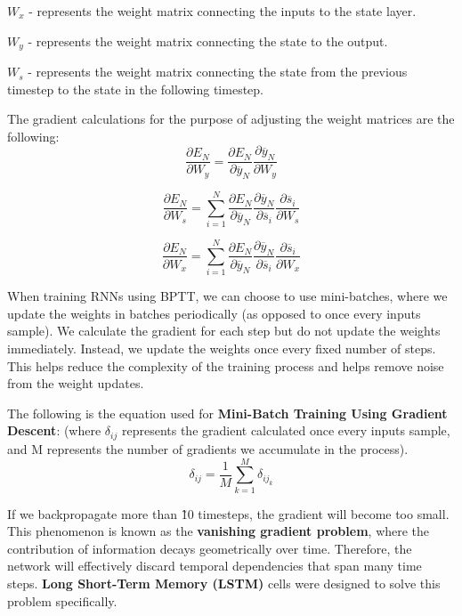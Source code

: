 \(W_x\) - represents the weight matrix connecting the inputs to the state layer.\newline

\(W_y\) - represents the weight matrix connecting the state to the output. \newline

\(W_s\) - represents the weight matrix connecting the state from the previous timestep to the state in the following timestep. \newline

The gradient calculations for the purpose of adjusting the weight matrices are the following: \[\frac{\partial E_N}{\partial W_y} = \frac{\partial E_N}{\partial \overline{y}_N} \frac{\partial \overline{y}_N}{\partial W_y}\] 

\[\frac{\partial E_N}{\partial W_s} = \sum_{i=1}^N \frac{\partial E_N}{\partial \overline{y}_N} \frac{\partial \overline{y}_N}{\partial \overline{s}_i} \frac{\partial \overline{s}_i}{\partial W_s}\] 

\[\frac{\partial E_N}{\partial W_x} = \sum_{i=1}^N \frac{\partial E_N}{\partial \overline{y}_N} \frac{\partial \overline{y}_N}{\partial \overline{s}_i} \frac{\partial \overline{s}_i}{\partial W_x}\] 

When training RNNs using BPTT, we can choose to use mini-batches, where we update the weights in batches periodically (as opposed to once every inputs sample). We calculate the gradient for each step but do not update the weights immediately. Instead, we update the weights once every fixed number of steps. This helps reduce the complexity of the training process and helps remove noise from the weight updates. \newline

The following is the equation used for \textbf{Mini-Batch Training Using Gradient Descent}: (where \(\delta_{ij}\) represents the gradient calculated once every inputs sample, and M represents the number of gradients we accumulate in the process). \[\delta_{ij} = \frac{1}{M}\sum_{k=1}^M \delta_{ij_k}\] 

If we backpropagate more than \~10 timesteps, the gradient will become too small. This phenomenon is known as the \textbf{vanishing gradient problem}, where the contribution of information decays geometrically over time. Therefore, the network will effectively discard temporal dependencies that span many time steps. \textbf{Long Short-Term Memory (LSTM)} cells were designed to solve this problem specifically. \newline

